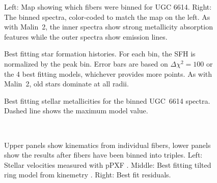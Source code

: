 \documentclass{emulateapj}
\begin{document}
\begin{figure}
\caption{Left:  Map showing which fibers were binned for UGC 6614.  Right:  The binned spectra, color-coded to match the map on the left.  As with Malin~2, the inner spectra show strong metallicity absorption features while the outer spectra show emission lines. \label{ugc_binmap}}
\end{figure}




\begin{figure}
\caption{Best fitting star formation histories.  For each bin, the SFH is normalized by the peak bin.  Error bars are based on $\Delta\chi^2=100$ or the 4 best fitting models, whichever provides more points.  As with Malin~2, old stars dominate at all radii.  \label{sfh_ugc} }
\end{figure}


\begin{figure}
\caption{Best fitting stellar metallicities for the binned UGC~6614 spectra.  Dashed line shows the maximum model value.  \label{metal_ugc}}
\end{figure}


\begin{figure*}
 \\
\caption{Upper panels show kinematics from individual fibers, lower panels show the results after fibers have been binned into triples.  Left:  Stellar velocities measured with pPXF \citep{Cappellari04}. Middle:  Best fitting tilted ring model from kinemetry \citet{Krajn06}. Right: Best fit residuals.  \label{ugc_kinem_fibers}}
\end{figure*}
\end{document}
